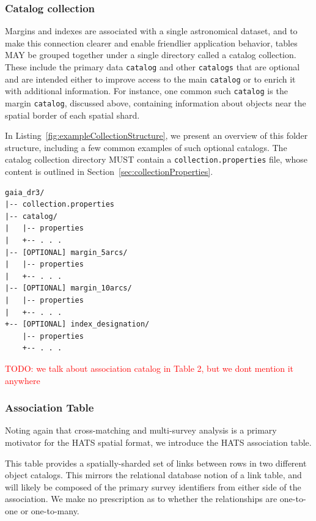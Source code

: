 \documentclass[11pt,a4paper]{ivoa}
\begin{document}
\subsubsection{Catalog collection} \label{sec:collection}

Margins and indexes are associated with a single astronomical dataset, and to make this connection clearer and enable friendlier application behavior, tables MAY be grouped together under a single directory called a catalog collection.
These include the primary data \texttt{catalog} and other \texttt{catalogs} that are optional and are intended either to improve access to the main \texttt{catalog} or to enrich it with additional information. 
For instance, one common such \texttt{catalog} is the margin \texttt{catalog}, discussed above, containing information about objects near the spatial border of each spatial shard. \par 

In Listing~\ref{fig:exampleCollectionStructure}, we present an overview of this folder structure, including a few common examples of such optional catalogs.
The catalog collection directory MUST contain a \texttt{collection.properties} file, whose content is outlined in Section~\ref{sec:collectionProperties}.

\begin{minipage}{\linewidth}
\begin{lstlisting}[caption=Example collection directory contents, label=fig:exampleCollectionStructure]
gaia_dr3/
|-- collection.properties
|-- catalog/
|   |-- properties
|   +-- . . .
|-- [OPTIONAL] margin_5arcs/
|   |-- properties
|   +-- . . .
|-- [OPTIONAL] margin_10arcs/
|   |-- properties
|   +-- . . .
+-- [OPTIONAL] index_designation/
    |-- properties
    +-- . . .
\end{lstlisting}
\end{minipage}
\textcolor{red}{TODO: we talk about association catalog in Table 2, but we dont mention it anywhere}
\subsubsection{Association Table} \label{sec:association}

Noting again that cross-matching and multi-survey analysis is a primary motivator for the HATS spatial format, we introduce the HATS association table. 

This table provides a spatially-sharded set of links between rows in two different object catalogs. 
This mirrors the relational database notion of a link table, and will likely be composed of the primary survey identifiers from either side of the association.
We make no prescription as to whether the relationships are one-to-one or one-to-many. \par
\end{document}
